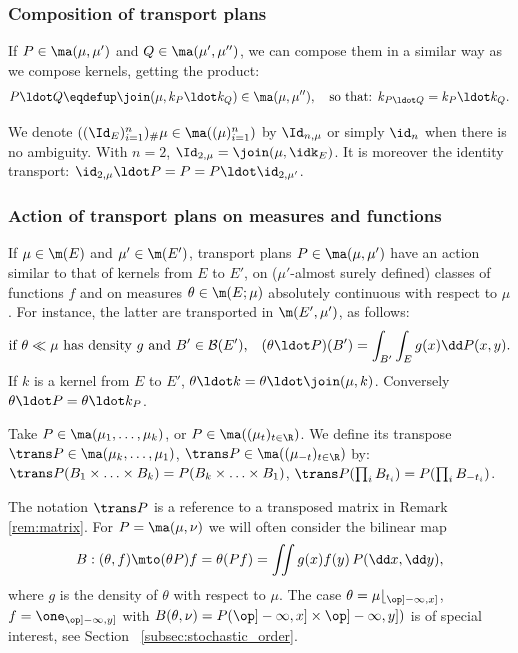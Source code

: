 \subsubsection{Composition of transport plans}\label{subsubsec:composition} If $P\in\ma(\mu,\mu')$ and $Q\in\ma(\mu',\mu'')$, we can compose them in a similar way as we compose kernels, getting the product:\vspace*{-3pt}
\[P\ldot Q\eqdefup\join(\mu,k_P\ldot k_Q)\in\ma(\mu,\mu''),\quad \text{so that: }k_{P\ldot Q}=k_P\ldot k_Q.\]

\begin{notation}\label{notation:transport_id}
We denote $((\Id_E)_{i=1}^n)_\#\mu\in\ma((\mu)_{i=1}^n)$ by $\Id_{n,\mu}$ or simply $\id_n$ when there is no ambiguity. With $n=2$, $\Id_{2,\mu}=\join(\mu,\idk_E)$. It is moreover the identity transport: $\id_{2,\mu}{}\ldot P=P=P\ldot \id_{2,\mu'}$.
\end{notation}

\subsubsection{Action of transport plans on measures and functions}\label{subsubsec:action_des_transports} If $\mu\in\m(E)$ and $\mu'\in\m(E')$, transport plans $P\in\ma(\mu,\mu')$ have an action similar to that of kernels from $E$ to $E'$, on ($\mu'$-almost surely defined) classes of functions $f$ and on measures $\theta\in\m(E;\mu)$ absolutely continuous with respect to $\mu$. For instance, the latter are transported in $\m(E',\mu')$, as follows:
\[\text{if $\theta\ll \mu$ has density $g$ and $B'\in{\mathcal B}(E')$,}\quad(\theta\ldot P)(B')=\int_{B'}\int_E g(x)\dd P(x,y).\]
If $k$ is a kernel from $E$ to $E'$, $\theta\ldot k=\theta\ldot \join(\mu,k)$. Conversely $\theta\ldot P=\theta\ldot k_P$.

\begin{defi}\label{defi:transpose} Take $P\in\ma(\mu_1,\ldots,\mu_k)$, or $P\in\ma((\mu_t)_{t\in\R})$. We define its transpose $\trans P\in\ma(\mu_k,\ldots,\mu_1)$, \resp $\trans P\in\ma((\mu_{-t})_{t\in\R})$ by: $ \trans P(B_1\times \ldots\times B_k)=P(B_k\times\ldots\times B_1)$, \resp $\trans P(\prod_iB_{t_i})=P(\prod_iB_{-t_i})$.
\end{defi}

The notation $\trans P$ is a reference to a transposed matrix in Remark \ref{rem:matrix}. For $P=\ma(\mu,\nu)$ we will often consider the bilinear map
\[B:(\theta,f)\mto (\theta P)f=\theta (Pf)=\iint g(x)f(y)\,P(\dd x,\dd y),\]
where $g$ is the density of $\theta$ with respect to $\mu$. The case $\theta=\mu\lfloor_{\op]-\infty,x]}$, $f=\one_{\op]-\infty,y]}$ with $B(\theta,\nu)=P(\op]-\infty,x]\times\op]-\infty,y])$ is of special interest, see Section~ \ref{subsec:stochastic_order}.

